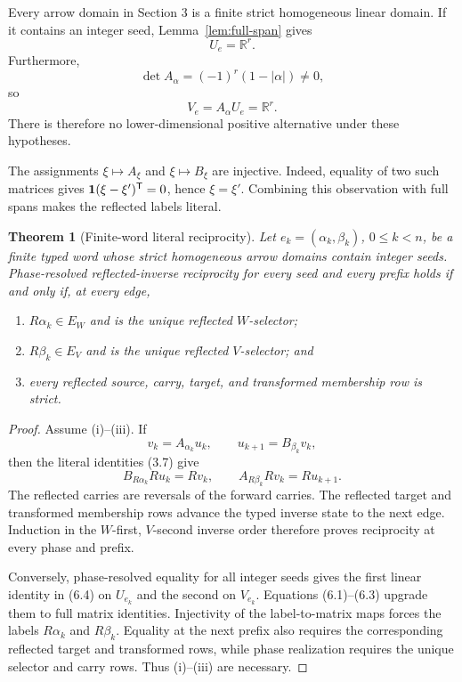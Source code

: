 \documentclass[11pt]{article}
\newtheorem{theorem}{Theorem}[section]
\theoremstyle{definition}
\theoremstyle{remark}
\begin{document}
Every arrow domain in Section 3 is a finite strict homogeneous linear
domain.  If it contains an integer seed, Lemma~\ref{lem:full-span} gives
\[
 U_e=\mathbb R^r.
\tag{6.1}
\]
Furthermore,
\[
 \det A_\alpha=(-1)^r(1-|\alpha|)\neq0,
\tag{6.2}
\]
so
\[
 V_e=A_\alpha U_e=\mathbb R^r.
\tag{6.3}
\]
There is therefore no lower-dimensional positive alternative under these
hypotheses.

The assignments \(\xi\mapsto A_\xi\) and \(\xi\mapsto B_\xi\) are
injective.  Indeed, equality of two such matrices gives
\(\mathbf{1}(\xi-\xi')^{\mathsf{T}}=0\), hence \(\xi=\xi'\).  Combining this
observation with full spans makes the reflected labels literal.

\begin{theorem}[Finite-word literal reciprocity]
\label{thm:reciprocity}
Let \(e_k=(\alpha_k,\beta_k)\), \(0\leq k<n\), be a finite typed word whose
strict homogeneous arrow domains contain integer seeds.  Phase-resolved
reflected-inverse reciprocity for every seed and every prefix holds if and
only if, at every edge,
\begin{enumerate}[label=(\roman*)]
\item \(R\alpha_k\in E_W\) and is the unique reflected \(W\)-selector;
\item \(R\beta_k\in E_V\) and is the unique reflected \(V\)-selector; and
\item every reflected source, carry, target, and transformed membership row
is strict.
\end{enumerate}
\end{theorem}

\begin{proof}
Assume (i)--(iii).  If
\[
 v_k=A_{\alpha_k}u_k,\qquad
 u_{k+1}=B_{\beta_k}v_k,
\]
then the literal identities (3.7) give
\[
 B_{R\alpha_k}Ru_k=Rv_k,\qquad
 A_{R\beta_k}Rv_k=Ru_{k+1}.
\tag{6.4}
\]
The reflected carries are reversals of the forward carries.  The reflected
target and transformed membership rows advance the typed inverse state to
the next edge.  Induction in the \(W\)-first, \(V\)-second inverse order
therefore proves reciprocity at every phase and prefix.

Conversely, phase-resolved equality for all integer seeds gives the first
linear identity in (6.4) on \(U_{e_k}\) and the second on \(V_{e_k}\).
Equations (6.1)--(6.3) upgrade them to full matrix identities.  Injectivity
of the label-to-matrix maps forces the labels \(R\alpha_k\) and
\(R\beta_k\).  Equality at the next prefix also requires the corresponding
reflected target and transformed rows, while phase realization requires
the unique selector and carry rows.  Thus (i)--(iii) are necessary.
\end{proof}
\end{document}
